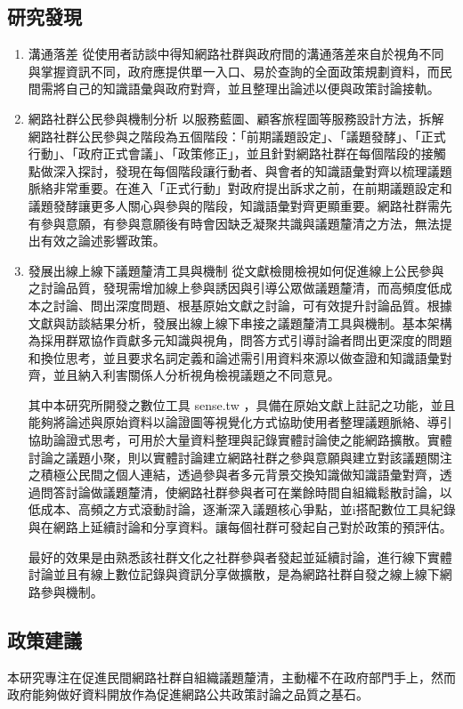 \documentclass[12pt,a4paper]{article}
\begin{document}
\subsection{研究發現}
\label{sec:orgd46af54}
\begin{enumerate}
\item 溝通落差
\label{sec:orgdaaacab}
從使用者訪談中得知網路社群與政府間的溝通落差來自於視角不同與掌握資訊不同，政府應提供單一入口、易於查詢的全面政策規劃資料，而民間需將自己的知識語彙與政府對齊，並且整理出論述以便與政策討論接軌。

\item 網路社群公民參與機制分析
\label{sec:orgc2c573e}
以服務藍圖、顧客旅程圖等服務設計方法，拆解網路社群公民參與之階段為五個階段：「前期議題設定」、「議題發酵」、「正式行動」、「政府正式會議」、「政策修正」，並且針對網路社群在每個階段的接觸點做深入探討，發現在每個階段讓行動者、與會者的知識語彙對齊以梳理議題脈絡非常重要。在進入「正式行動」對政府提出訴求之前，在前期議題設定和議題發酵讓更多人關心與參與的階段，知識語彙對齊更顯重要。網路社群需先有參與意願，有參與意願後有時會因缺乏凝聚共識與議題釐清之方法，無法提出有效之論述影響政策。

\item 發展出線上線下議題釐清工具與機制
\label{sec:orgdfdbfc8}
從文獻檢閱檢視如何促進線上公民參與之討論品質，發現需增加線上參與誘因與引導公眾做議題釐清，而高頻度低成本之討論、問出深度問題、根基原始文獻之討論，可有效提升討論品質。根據文獻與訪談結果分析，發展出線上線下串接之議題釐清工具與機制。基本架構為採用群眾協作貢獻多元知識與視角，問答方式引導討論者問出更深度的問題和換位思考，並且要求名詞定義和論述需引用資料來源以做查證和知識語彙對齊，並且納入利害關係人分析視角檢視議題之不同意見。

其中本研究所開發之數位工具 sense.tw ，具備在原始文獻上註記之功能，並且能夠將論述與原始資料以論證圖等視覺化方式協助使用者整理議題脈絡、導引協助論證式思考，可用於大量資料整理與記錄實體討論使之能網路擴散。實體討論之議題小聚，則以實體討論建立網路社群之參與意願與建立對該議題關注之積極公民間之個人連結，透過參與者多元背景交換知識做知識語彙對齊，透過問答討論做議題釐清，使網路社群參與者可在業餘時間自組織鬆散討論，以低成本、高頻之方式滾動討論，逐漸深入議題核心爭點，並i搭配數位工具紀錄與在網路上延續討論和分享資料。讓每個社群可發起自己對於政策的預評估。

最好的效果是由熟悉該社群文化之社群參與者發起並延續討論，進行線下實體討論並且有線上數位記錄與資訊分享做擴散，是為網路社群自發之線上線下網路參與機制。
\end{enumerate}

\subsection{政策建議}
\label{sec:org099aa21}
本研究專注在促進民間網路社群自組織議題釐清，主動權不在政府部門手上，然而政府能夠做好資料開放作為促進網路公共政策討論之品質之基石。
\end{document}
